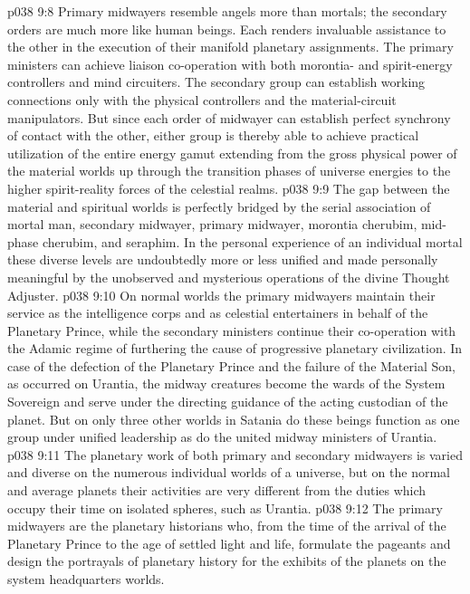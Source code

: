 \vs p038 9:8 Primary midwayers resemble angels more than mortals; the secondary orders are much more like human beings. Each renders invaluable assistance to the other in the execution of their manifold planetary assignments. The primary ministers can achieve liaison co\hyp{}operation with both morontia\hyp{} and spirit\hyp{}energy controllers and mind circuiters. The secondary group can establish working connections only with the physical controllers and the material\hyp{}circuit manipulators. But since each order of midwayer can establish perfect synchrony of contact with the other, either group is thereby able to achieve practical utilization of the entire energy gamut extending from the gross physical power of the material worlds up through the transition phases of universe energies to the higher spirit\hyp{}reality forces of the celestial realms.
\vs p038 9:9 The gap between the material and spiritual worlds is perfectly bridged by the serial association of mortal man, secondary midwayer, primary midwayer, morontia cherubim, mid\hyp{}phase cherubim, and seraphim. In the personal experience of an individual mortal these diverse levels are undoubtedly more or less unified and made personally meaningful by the unobserved and mysterious operations of the divine Thought Adjuster.
\vs p038 9:10 \pc On normal worlds the primary midwayers maintain their service as the intelligence corps and as celestial entertainers in behalf of the Planetary Prince, while the secondary ministers continue their co\hyp{}operation with the Adamic regime of furthering the cause of progressive planetary civilization. In case of the defection of the Planetary Prince and the failure of the Material Son, as occurred on Urantia, the midway creatures become the wards of the System Sovereign and serve under the directing guidance of the acting custodian of the planet. But on only three other worlds in Satania do these beings function as one group under unified leadership as do the united midway ministers of Urantia.
\vs p038 9:11 The planetary work of both primary and secondary midwayers is varied and diverse on the numerous individual worlds of a universe, but on the normal and average planets their activities are very different from the duties which occupy their time on isolated spheres, such as Urantia.
\vs p038 9:12 The primary midwayers are the planetary historians who, from the time of the arrival of the Planetary Prince to the age of settled light and life, formulate the pageants and design the portrayals of planetary history for the exhibits of the planets on the system headquarters worlds.
